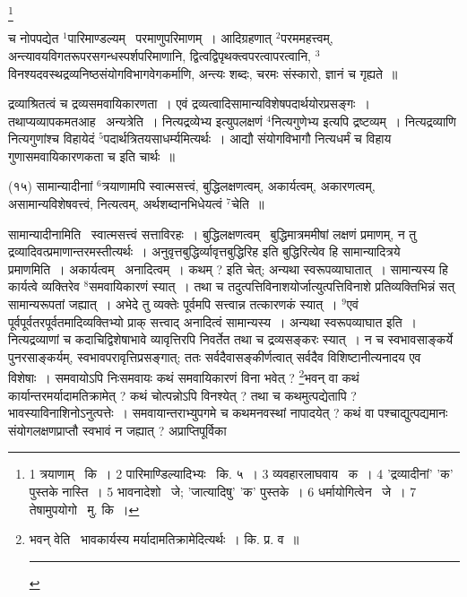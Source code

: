 \documentclass[11pt, openany]{book}
\newcommand\blfootnote[1]{%
 \begingroup
 \renewcommand\thefootnote{}\footnote{#1}%
 \addtocounter{footnote}{-1}%
 \endgroup
}
\begin{document}
\blfootnote{1 त्रयाणाम्  \textendash\ कि~। 2 पारिमाण्डिल्यादिभ्यः  \textendash\ कि. ५~। 3 व्यवहारलाघवाय  \textendash\ क~। 4 'द्रव्यादीनां' 'क' पुस्तके नास्ति~। 5 भावनादेशो \textendash\ जे; 'जात्यादिषु' 'क' पुस्तके~। 6 धर्मायोगित्वेन  \textendash\ जे~। 7 तेषामुपयोगो  \textendash\ मु. कि~।}

\newpage
\begin{sloppypar}
\noindent
च नोपपद्येत ${}^1$पारिमाण्डल्यम् \textendash\ परमाणुपरिमाणम्~। आदिग्रहणात् ${}^2$परममहत्त्वम्, अन्त्यावयविगतरूपरसगन्धस्पर्शपरिमाणानि, द्वित्वद्विपृथक्त्वपरत्वापरत्वानि, ${}^3$विनश्यदवस्थद्रव्यनिष्ठसंयोगविभागवेगकर्माणि, अन्त्यः शब्दः, चरमः संस्कारो, ज्ञानं च गृह्यते~॥
\end{sloppypar}

\begin{sloppypar}
द्रव्याश्रितत्वं च द्रव्यसमवायिकारणता~। एवं द्रव्यत्वादिसामान्यविशेषपदार्थयोरप्रसङ्गः~। तथाप्यव्यापकमतआह \textendash\ {\knu अन्यत्रे}ति~। नित्यद्रव्येभ्य इत्युपलक्षणं ${}^4$नित्यगुणेभ्य इत्यपि द्रष्टव्यम्~। नित्यद्रव्याणि नित्यगुणांश्च विहायेदं ${}^5$पदार्थत्रितयसाधर्म्यमित्यर्थः~। आद्यौ संयोगविभागौ नित्यधर्मं च विहाय गुणासमवायिकारणकता च इति चार्थः~॥
\end{sloppypar}

\hangindent=2cm {\knu (१५) सामान्यादीनाां ${}^6$त्रयाणामपि स्वात्मसत्त्वं, बुद्धिलक्षणत्वम्, अकार्यत्वम्, अकारणत्वम्, असामान्यविशेषवत्त्वं, नित्यत्वम्, अर्थशब्दानभिधेयत्वं ${}^7$चेति~॥}

{\knu सामान्यादीना}मिति \textendash\ स्वात्मसत्त्वं सत्ताविरहः~। बुद्धिलक्षणत्वम् \textendash\ बुद्धिमात्रममीषां लक्षणं प्रमाणम्, न तु द्रव्यादिवत्प्रमाणान्तरमस्तीत्यर्थः~। अनुवृत्तबुद्धिर्व्यावृत्तबुद्धिरिह इति बुद्धिरित्येव हि सामान्यादित्रये प्रमाणमिति~। अकार्यत्वम् \textendash\ अनादित्वम्~। कथम् ? इति चेत्; अन्यथा स्वरूपव्याघातात्~। सामान्यस्य हि कार्यत्वे व्यक्तिरेव ${}^8$समवायिकारणं स्यात्~। तथा च तदुत्पत्तिविनाशयोर्जात्युत्पत्तिविनाशे प्रतिव्यक्तिभिन्नं सत् सामान्यरूपतां जह्यात्~। अभेदे तु व्यक्तेः पूर्वमपि सत्त्वान्न तत्कारणकं स्यात्~। ${}^9$एवं पूर्वपूर्वतरपूर्वतमादिव्यक्तिभ्यो प्राक् सत्त्वाद् अनादित्वं सामान्यस्य~। अन्यथा स्वरूपव्याघात इति~। नित्यद्रव्याणां च कदाचिद्विशेषाभावे व्यावृत्तिरपि निवर्तेत तथा च द्रव्यसङ्करः स्यात्~। न च स्वभावसाङ्कर्ये पुनरसाङ्कर्यम्, स्वभावपरावृत्तिप्रसङ्गात्; ततः सर्वदैवासङ्कीर्णत्वात् सर्वदैव विशिष्टानीत्यनादय एव विशेषाः~। समवायोऽपि निःसमवायः कथं समवायिकारणं विना भवेत् ? \renewcommand{\thefootnote}{१}\footnote{भवन् वेति \textendash\ भावकार्यस्य मर्यादामतिक्रामेदित्यर्थः~। कि. प्र. व~॥ \rule{0.4\linewidth}{0.5pt}}भवन् वा कथं कार्यान्तरमर्यादामतिक्रामेत् ? कथं चोत्पन्नोऽपि विनश्येत् ? तथा च कथमुत्पद्येतापि ? भावस्याविनाशिनोऽनुत्पत्तेः~। समवायान्तराभ्युपगमे च कथमनवस्थां नापादयेत् ? कथं वा पश्चाद्युत्पद्यमानः संयोगलक्षणप्राप्तौ स्वभावं न जह्यात् ? अप्राप्तिपूर्विका\textendash
\end{document}
